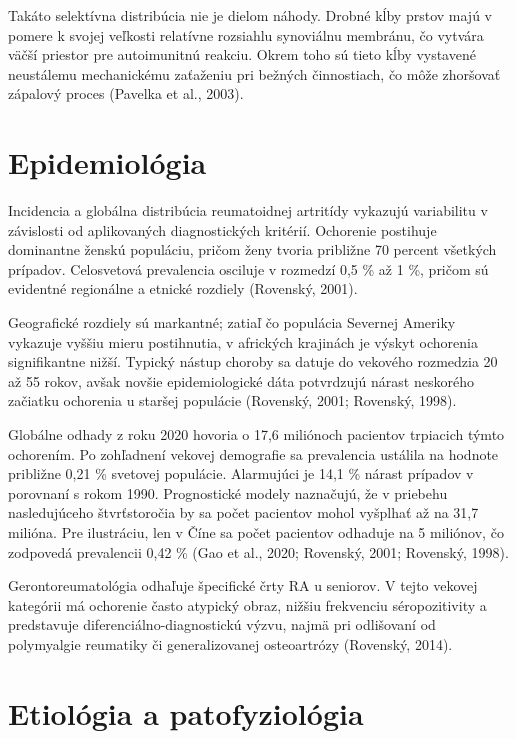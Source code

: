 Takáto selektívna distribúcia nie je dielom náhody. Drobné kĺby prstov majú v pomere k svojej veľkosti relatívne rozsiahlu synoviálnu membránu, čo vytvára väčší priestor pre autoimunitnú reakciu. Okrem toho sú tieto kĺby vystavené neustálemu mechanickému zaťaženiu pri bežných činnostiach, čo môže zhoršovať zápalový proces (Pavelka et al., 2003). 

\section{Epidemiológia}

Incidencia a globálna distribúcia reumatoidnej artritídy vykazujú variabilitu v závislosti od aplikovaných diagnostických kritérií. Ochorenie postihuje dominantne ženskú populáciu, pričom ženy tvoria približne 70 percent všetkých prípadov. Celosvetová prevalencia osciluje v rozmedzí 0,5 \% až 1 \%, pričom sú evidentné regionálne a etnické rozdiely (Rovenský, 2001). 

Geografické rozdiely sú markantné; zatiaľ čo populácia Severnej Ameriky vykazuje vyššiu mieru postihnutia, v afrických krajinách je výskyt ochorenia signifikantne nižší. Typický nástup choroby sa datuje do vekového rozmedzia 20 až 55 rokov, avšak novšie epidemiologické dáta potvrdzujú nárast neskorého začiatku ochorenia u staršej populácie (Rovenský, 2001; Rovenský, 1998). 

Globálne odhady z roku 2020 hovoria o 17,6 miliónoch pacientov trpiacich týmto ochorením. Po zohľadnení vekovej demografie sa prevalencia ustálila na hodnote približne 0,21 \% svetovej populácie. Alarmujúci je 14,1 \% nárast prípadov v porovnaní s rokom 1990. Prognostické modely naznačujú, že v priebehu nasledujúceho štvrťstoročia by sa počet pacientov mohol vyšplhať až na 31,7 milióna. Pre ilustráciu, len v Číne sa počet pacientov odhaduje na 5 miliónov, čo zodpovedá prevalencii 0,42 \% (Gao et al., 2020; Rovenský, 2001; Rovenský, 1998). 

Gerontoreumatológia odhaľuje špecifické črty RA u seniorov. V tejto vekovej kategórii má ochorenie často atypický obraz, nižšiu frekvenciu séropozitivity a predstavuje diferenciálno-diagnostickú výzvu, najmä pri odlišovaní od polymyalgie reumatiky či generalizovanej osteoartrózy (Rovenský, 2014). 

\section{Etiológia a patofyziológia}

